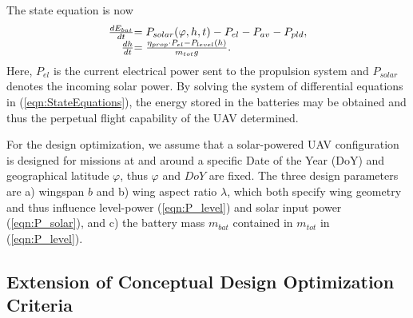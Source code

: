 The state equation is now
\begin{equation}\label{eqn:StateEquations}
\begin{array}{r@{}l}
\frac{dE_{bat}}{dt}&=P_{solar}(\varphi,h,t)-P_{el}-P_{av}-P_{pld},\\
\frac{dh}{dt}&=\frac{\eta_{prop}\cdot P_{el}-P_{level}(h)}{m_{tot}g} .
\end{array}
\end{equation}
Here, $P_{el}$ is the current electrical power sent to the propulsion system and $P_{solar}$ denotes the incoming solar power. By solving the system of differential equations in (\ref{eqn:StateEquations}), the energy stored in the batteries may be obtained and thus the perpetual flight capability of the UAV determined.

For the design optimization, we assume that a solar-powered UAV configuration is designed for missions at and around a specific Date of the Year (DoY) and geographical latitude $\varphi$, thus $\varphi$ and $DoY$ are fixed. The three design parameters are a) wingspan $b$ and b) wing aspect ratio $\lambda$, which both specify wing geometry and thus influence level-power (\ref{eqn:P_level}) and solar input power (\ref{eqn:P_solar}), and c) the battery mass $m_{bat}$ contained in $m_{tot}$ in (\ref{eqn:P_level}).

\subsection{Extension of Conceptual Design Optimization Criteria}

